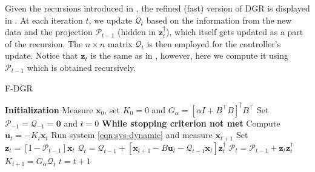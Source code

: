 \documentclass[journal]{IEEEtran}
\theoremstyle{definition}
\theoremstyle{remark}
\newcommand\x{{\bm x}}
\def\u{{\bm u}}
\newcommand\z{{\bm z}}
\begin{document}
\noindent Given the recursions introduced in , the refined (fast) version of \ac{DGR} is displayed in .
%
At each iteration $t$, we update $\mathcal{Q}_t$ based on the information from the new data and the projection $\mathcal{P}_{t-1}$ (hidden in $\z_t^\dagger$), which itself gets updated as a part of the recursion.
%
The $n \times n$ matrix $\mathcal{Q}_t$ is then employed for the controller's update.
%
Notice that $\z_t$ is the same as in , however, here we compute it using $\mathcal{P}_{t-1}$ which is obtained recursively.

\begin{algorithm}[b]
	\caption{\acf{F-DGR}}
	\begin{algorithmic}[1]
		\State \textbf{Initialization}
		\State \hspace{5mm} Measure $\x_0$, set $K_0 = 0$ and {$G_\alpha = [\alpha I + B^\intercal B]^\dagger B^\intercal$}
        \State \hspace{5mm} Set $\mathcal{P}_{-1} = \mathcal{Q}_{-1} = \mathbf{0}$ and $t = 0$
		\State \textbf{While stopping criterion not met}
		\State \hspace{5mm} Compute $\u_t = -K_t \x_t$
		\State \hspace{5mm} Run system \eqref{eqn:sys-dynamic} and measure $\x_{t+1}$
		\State \hspace{5mm} Set \hspace{1mm} $\z_t = [\mathrm{I}-\mathcal{P}_{t-1}]\x_t$
		\State \hspace{12mm} $\mathcal{Q}_t = \mathcal{Q}_{t-1} + [\x_{t+1} - B\u_t - \mathcal{Q}_{t-1} \x_t]\z_t^\dagger$
		\State \hspace{12.5mm} $\mathcal{P}_t = \mathcal{P}_{t-1} + \z_t\z_t^\dagger$
		\State \hspace{12.5mm} $K_{t+1} =  G_\alpha \mathcal{Q}_t$
		\State \hspace{5mm} $t = t+1$
	\end{algorithmic}
	\label{alg:Controller_fast}
\end{algorithm}
\end{document}
